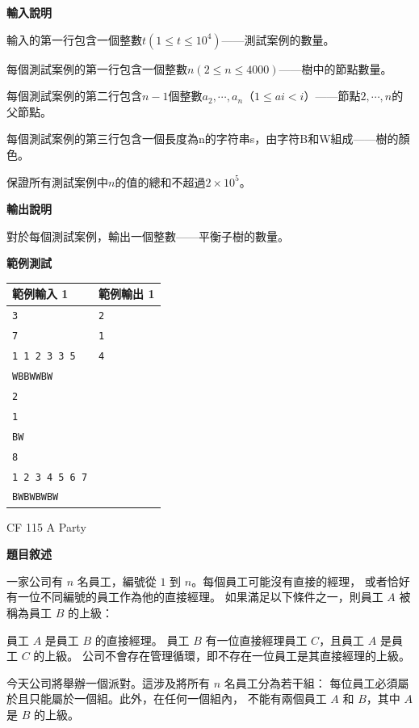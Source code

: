     \textbf{輸入說明}

    輸入的第一行包含一個整數$t(1 \le t \le 10^4)$——測試案例的數量。

    每個測試案例的第一行包含一個整數$n(2 \le n \le 4000)$——樹中的節點數量。

    每個測試案例的第二行包含$n-1$個整數$a_2,\cdots,a_n（1 \le ai <i）$——節點$2,\cdots,n$的父節點。

    每個測試案例的第三行包含一個長度為n的字符串s，由字符B和W組成——樹的顏色。

    保證所有測試案例中$n$的值的總和不超過$2 \times 10^5$。
    
    \textbf{輸出說明}

    對於每個測試案例，輸出一個整數——平衡子樹的數量。

    \textbf{範例測試}

    \begin{tabular}{|m{7cm}|m{7cm}|}
        \hline
        範例輸入 1 & 範例輸出 1 \\
        \hline
        \verb|3|           & \verb|2| \\
        \verb|7|           & \verb|1| \\
        \verb|1 1 2 3 3 5| & \verb|4| \\
        \verb|WBBWWBW| & \\
        \verb|2|  & \\
        \verb|1|  & \\
        \verb|BW| & \\
        \verb|8|  & \\
        \verb|1 2 3 4 5 6 7| & \\
        \verb|BWBWBWBW|      & \\
        \hline
    \end{tabular}

    \problem CF 115 A Party

    \textbf{題目敘述}

    一家公司有 $n$ 名員工，編號從 $1$ 到 $n$。每個員工可能沒有直接的經理，
    或者恰好有一位不同編號的員工作為他的直接經理。
    如果滿足以下條件之一，則員工 $A$ 被稱為員工 $B$ 的上級：

    員工 $A$ 是員工 $B$ 的直接經理。
    員工 $B$ 有一位直接經理員工 $C$，且員工 $A$ 是員工 $C$ 的上級。
    公司不會存在管理循環，即不存在一位員工是其直接經理的上級。

    今天公司將舉辦一個派對。這涉及將所有 $n$ 名員工分為若干組：
    每位員工必須屬於且只能屬於一個組。此外，在任何一個組內，
    不能有兩個員工 $A$ 和 $B$，其中 $A$ 是 $B$ 的上級。

